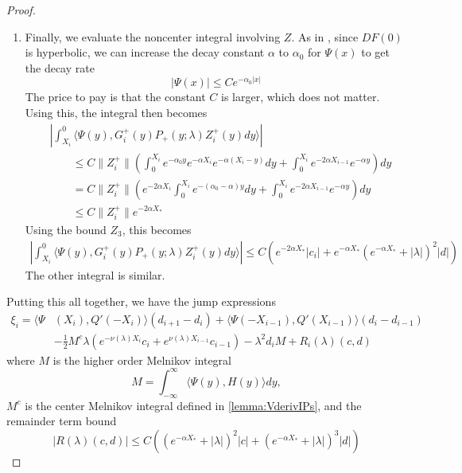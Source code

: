 \documentclass[thesis.tex]{subfiles}
\begin{document}
\begin{lemma}
\begin{proof}
\begin{enumerate}
\item Finally, we evaluate the noncenter integral involving $Z$. As in \cite[p. 448]{Sandstede1998}, since $DF(0)$ is hyperbolic, we can increase the decay constant $\alpha$ to $\alpha_0$ for $\Psi(x)$ to get the decay rate
\[
|\Psi(x)| \leq C e^{-\alpha_0 |x|}
\]
The price to pay is that the constant $C$ is larger, which does not matter. Using this, the integral then becomes
\begin{align*}
&\left| \int_{X_i}^0 \langle \Psi(y), G_i^+(y) P_+(y; \lambda) Z_i^+(y) dy \rangle \right| \\
&\qquad \leq C \| Z_i^+\|  \left( \int_0^{X_i} e^{-\alpha_0 y} e^{-\alpha X_i} e^{-\alpha(X_i - y)} dy + \int_0^{X_i} e^{-2 \alpha X_{i-1}} e^{-\alpha y} \right) dy \\
&\qquad =C \| Z_i^+\|  \left( e^{-2 \alpha X_i} \int_0^{X_i} e^{-(\alpha_0 - \alpha) y} dy + \int_0^{X_i} e^{-2 \alpha X_{i-1}} e^{-\alpha y} \right) dy \\
&\qquad \leq C \| Z_i^+\| e^{-2 \alpha X_*}
\end{align*}
Using the bound $Z_3$, this becomes
\begin{align*}
\left| \int_{X_i}^0 \langle \Psi(y), G_i^+(y) P_+(y; \lambda) Z_i^+(y) dy \rangle \right|\leq C \left( e^{-2 \alpha X_* } |c_i| + e^{-\alpha X_* }(e^{-\alpha X_*} + |\lambda|)^2 |d| \right)
\end{align*}
The other integral is similar.
\end{enumerate}

Putting this all together, we have the jump expressions
\begin{align*}
\xi_i = \langle \Psi&(X_i), Q'(-X_i) \rangle (d_{i+1} - d_i ) + \langle \Psi(-X_{i-1}), Q'(X_{i-1}) \rangle (d_i - d_{i-1} ) \\
&- \frac{1}{2} M^c \lambda( e^{-\nu(\lambda)X_i}c_i + e^{\nu(\lambda)X_{i-1}}c_{i-1})
- \lambda^2 d_i M + R_i(\lambda)(c, d)
\end{align*}
where $M$ is the higher order Melnikov integral
\[
M = \int_{-\infty}^\infty \langle \Psi(y), H(y) \rangle dy,
\]
$M^c$ is the center Melnikov integral defined in \cref{lemma:VderivIPs}, and the remainder term bound
\begin{equation}\label{noncenterR}
|R(\lambda)(c, d)| \leq C \left( (e^{-\alpha X_*} + |\lambda|)^2 |c| + (e^{-\alpha X_*} + |\lambda|)^3 |d| \right)
\end{equation}


\end{proof}
\end{lemma}
\end{document}
